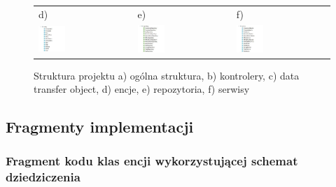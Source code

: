 \begin{figure}[htb]
\begin{tabular}{@{}lll@{}}
	d) & e) & f) \\
	\includegraphics[width=0.3\textwidth]{rys05/backend/entity.pdf} &
	\includegraphics[width=0.3\textwidth]{rys05/backend/repository.pdf} &
	\includegraphics[width=0.3\textwidth]{rys05/backend/service.pdf}
	\end{tabular}
  \caption{Struktura projektu a) ogólna struktura, b) kontrolery, c) data transfer object, d) encje, e) repozytoria, f) serwisy}
  \label{backend_struktura:label}
\end{figure}

\newpage
\subsection{Fragmenty implementacji}
\subsubsection {Fragment kodu klas encji wykorzystującej schemat dziedziczenia}

